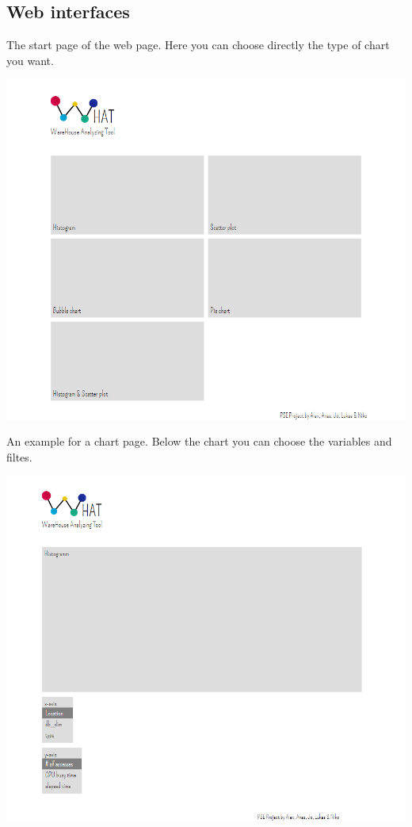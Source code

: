 \subsection{Web interfaces}
The start page of the web page. Here you can choose directly the type of chart you want.
\begin{center}
\includegraphics[width=1\linewidth]{Pictures/WHAT-Start.png}
\end{center} 
\newpage
An example for a \gls{chart} page. Below the chart you can choose the variables and filtes.
\begin{center}
\includegraphics[width=1\linewidth]{Pictures/WHAT-Histogram.png}
\end{center} 










